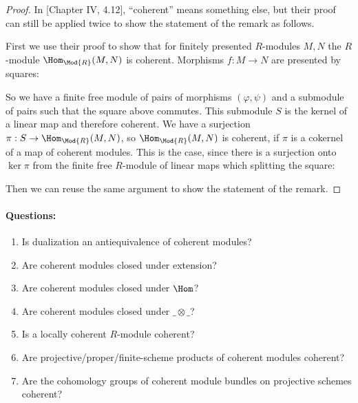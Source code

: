 \begin{proof}
  In \cite{lombardi-quitte}[Chapter IV, 4.12], ``coherent'' means something else, but their proof can still be applied twice to show the statement of the remark as follows.
  
  First we use their proof to show that for finitely presented $R$-modules $M,N$ the $R$-module $\Hom_{\Mod{R}}(M,N)$ is coherent. Morphisms $f:M\to N$ are presented by squares:
  \begin{center}
\end{center}
  So we have a finite free module of pairs of morphisms $(\varphi,\psi)$ and a submodule of pairs such that the square above commutes.
  This submodule $S$ is the kernel of a linear map and therefore coherent.
  We have a surjection $\pi:S\to \Hom_{\Mod{R}}(M,N)$, so $\Hom_{\Mod{R}}(M,N)$ is coherent,
  if $\pi$ is a cokernel of a map of coherent modules.
  This is the case, since there is a surjection onto $\ker{\pi}$ from the finite free $R$-module of linear maps which splitting the square:
  \begin{center}
\end{center}
  Then we can reuse the same argument to show the statement of the remark.
\end{proof}

\paragraph{Questions:}
\begin{enumerate}
\item Is dualization an antiequivalence of coherent modules?
\item Are coherent modules closed under extension?
\item Are coherent modules closed under $\Hom$?
\item Are coherent modules closed under $\_\otimes\_$?
\item \label{coherent-local} Is a locally coherent $R$-module coherent?
\item Are projective/proper/finite-scheme products of coherent modules coherent?
\item Are the cohomology groups of coherent module bundles on projective schemes coherent?
\end{enumerate}

